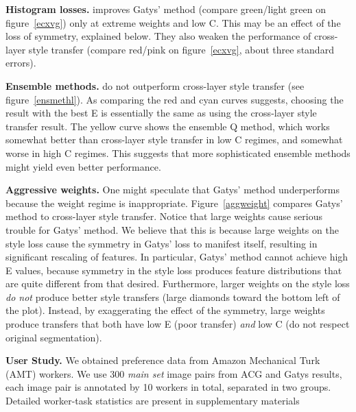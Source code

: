 \documentclass[runningheads]{llncs}
\begin{document}
{\bf Histogram losses.} improves Gatys' method (compare green/light green on figure~\ref{ecxvg}) only at extreme weights and low C. This may be an effect of the loss of symmetry, explained below. They also weaken the performance of cross-layer style transfer (compare red/pink on figure~\ref{ecxvg}, about three standard errors). 

{\bf Ensemble methods.} do not outperform cross-layer style transfer (see figure~\ref{ensmethl}).  As comparing the red and cyan curves suggests, choosing the result with the best E is essentially the same as using the cross-layer style transfer result. The yellow curve shows the ensemble Q method, which works somewhat better than cross-layer style transfer in low C regimes, and somewhat worse in high C regimes.  This suggests that more sophisticated ensemble methods might yield even better performance.




{\bf Aggressive weights.} One might speculate that Gatys' method underperforms because the weight regime is inappropriate. Figure~\ref{aggweight} compares Gatys' method to cross-layer style transfer. Notice that large weights cause serious trouble for Gatys' method.  We believe that this is because large weights on the style loss cause the symmetry in Gatys' loss to manifest itself, resulting in significant rescaling of features. In particular, Gatys' method cannot achieve high E values, because symmetry in the style loss produces feature distributions that are quite different from that desired. Furthermore, larger weights on the style loss {\em do not} produce better style transfers (large diamonds toward the bottom left of the plot).  Instead, by exaggerating the effect of the symmetry, large weights produce transfers that both have low E (poor transfer) {\em and} low C (do not respect original segmentation).  

\textbf{User Study.} We obtained preference data from Amazon Mechanical Turk (AMT) workers. We use 300 \textit{main set} image pairs from ACG and Gatys results, each image pair is annotated by 10 workers in total, separated in two groups. Detailed worker-task statistics are present in supplementary materials
\end{document}
